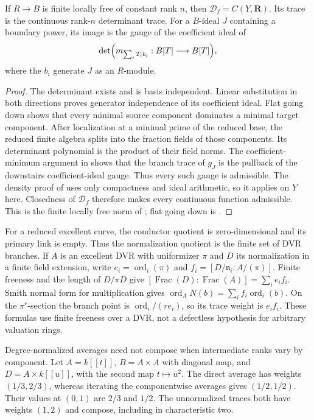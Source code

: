 \begin{proposition}\label{prop:supplied-p126-finite-flat-trace}
If $R\to B$ is finite locally free of constant rank $n$, then
$\mathcal D_f=C(Y,\mathbf R)$. Its trace is the continuous rank-$n$
determinant trace. For a $B$-ideal $J$ containing a boundary power, its
image is the gauge of the coefficient ideal of
\[
 \det\Bigl(m_{\sum_iT_ib_i}:B[T]\longrightarrow B[T]\Bigr),
\]
where the $b_i$ generate $J$ as an $R$-module.
\end{proposition}

\begin{proof}
The determinant exists and is basis independent. Linear substitution
in both directions proves generator independence of its coefficient
ideal. Flat going down shows that every minimal source component
dominates a minimal target component. After localization at a minimal
prime of the reduced base, the reduced finite algebra splits into the
fraction fields of those components. Its determinant polynomial is
the product of their field norms. The coefficient-minimum argument in
 shows that the branch trace
of $g_J$ is the pullback of the downstairs coefficient-ideal gauge.
Thus every such gauge is admissible. The density proof of
 uses only compactness and ideal
arithmetic, so it applies on $Y$ here. Closedness of $\mathcal D_f$
therefore makes every continuous function admissible. This is the
finite locally free norm of \cite[Tag~0BD2]{StacksProject}; flat going
down is \cite[Tag~00HS]{StacksProject}.
\end{proof}

For a reduced excellent curve, the conductor quotient is zero-dimensional
and its primary link is empty. Thus the normalization quotient is the
finite set of DVR branches. If $A$ is an excellent DVR with uniformizer
$\pi$ and $D$ its normalization in a finite field extension, write
$e_i=\operatorname{ord}_i(\pi)$ and
$f_i=[D/\mathfrak n_i:A/(\pi)]$. Finite freeness and the length of
$D/\pi D$ give $[\operatorname{Frac}(D):\operatorname{Frac}(A)]=\sum_ie_if_i$.
Smith normal form for multiplication gives
$\operatorname{ord}_A N(b)=\sum_i f_i\operatorname{ord}_i(b)$.
On the $\pi^r$-section the branch point is
$\operatorname{ord}_i/(re_i)$, so its trace weight is $e_if_i$.
These formulas use finite freeness over a DVR, not a defectless
hypothesis for arbitrary valuation rings.

Degree-normalized averages need not compose when intermediate ranks
vary by component. Let $A=k[[t]]$, $B=A\times A$ with diagonal map,
and $D=A\times k[[u]]$, with the second map $t\mapsto u^2$.
The direct average has weights $(1/3,2/3)$, whereas iterating the
componentwise averages gives $(1/2,1/2)$. Their values at $(0,1)$ are
$2/3$ and $1/2$. The unnormalized traces both have weights $(1,2)$
and compose, including in characteristic two.

